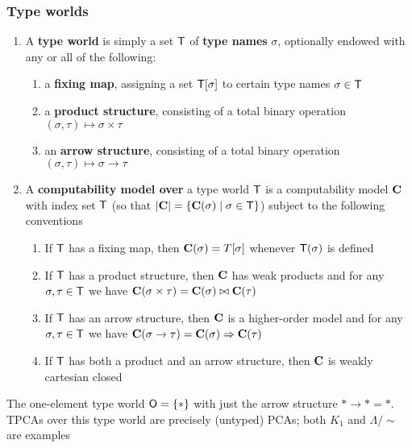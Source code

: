 \documentclass[11pt]{article}
\begin{document}
\subsubsection{Type worlds}
\label{sec:org88cff48}
\begin{definition}[]
\begin{enumerate}
\item A \textbf{type world} is simply a set \(\textsf{T}\) of \textbf{type names} \(\sigma\), optionally endowed with any or
all of the following:
\begin{enumerate}
\item a \textbf{fixing map}, assigning a set \(\textsf{T}[\sigma]\) to certain type names \(\sigma\in\textsf{T}\)
\item a \textbf{product structure}, consisting of a total binary operation \((\sigma,\tau)\mapsto\sigma\times\tau\)
\item an \textbf{arrow structure}, consisting of a total binary operation \((\sigma,\tau)\mapsto\sigma\to\tau\)
\end{enumerate}
\item A \textbf{computability model over} a type world \(\textsf{T}\) is a computability model \(\operatorname{\textbf{C}}\) with index
set \(\textsf{T}\) (so that \(\abs{\bC}=\{\bC(\sigma)\mid\sigma\in\sfT\}\)) subject to the following conventions
\begin{enumerate}
\item If \(\textsf{T}\) has a fixing map, then \(\operatorname{\textbf{C}}(\sigma)=T[\sigma]\) whenever \(\textsf{T}(\sigma)\) is defined
\item If \(\textsf{T}\) has a product structure, then \(\operatorname{\textbf{C}}\) has weak products and for any \(\sigma,\tau\in\textsf{T}\)
we have \(\operatorname{\textbf{C}}(\sigma\times\tau)=\operatorname{\textbf{C}}(\sigma)\bowtie\operatorname{\textbf{C}}(\tau)\)
\item If \(\textsf{T}\) has an arrow structure, then \(\operatorname{\textbf{C}}\) is a higher-order model and for
any \(\sigma,\tau\in\textsf{T}\) we have \(\operatorname{\textbf{C}}(\sigma\to\tau)=\operatorname{\textbf{C}}(\sigma)\Rightarrow\operatorname{\textbf{C}}(\tau)\)
\item If \(\textsf{T}\) has both a product and an arrow structure, then \(\operatorname{\textbf{C}}\) is weakly cartesian closed
\end{enumerate}
\end{enumerate}
\end{definition}

\begin{examplle}[]
The one-element type world \(\textsf{O}=\{*\}\) with just the arrow structure \(*\to*=*\). TPCAs over this
type world are precisely (untyped) PCAs; both \(K_1\) and \(\Lambda/\sim\) are examples
\end{examplle}
\end{document}
